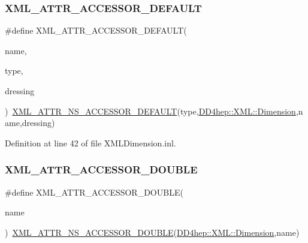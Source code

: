 \hypertarget{_x_m_l_dimension_8inl_a5329c32158716b05939bad5ab5e572df}{}\label{_x_m_l_dimension_8inl_a5329c32158716b05939bad5ab5e572df} 
\subsubsection{\texorpdfstring{X\+M\+L\+\_\+\+A\+T\+T\+R\+\_\+\+A\+C\+C\+E\+S\+S\+O\+R\+\_\+\+D\+E\+F\+A\+U\+LT}{XML\_ATTR\_ACCESSOR\_DEFAULT}}
{\footnotesize\ttfamily \#define X\+M\+L\+\_\+\+A\+T\+T\+R\+\_\+\+A\+C\+C\+E\+S\+S\+O\+R\+\_\+\+D\+E\+F\+A\+U\+LT(\begin{DoxyParamCaption}\item[{}]{name,  }\item[{}]{type,  }\item[{}]{dressing }\end{DoxyParamCaption})~\hyperlink{_x_m_l_dimension_8inl_a621d9cfc07f37e663ecb8f6c5bd22dfa}{X\+M\+L\+\_\+\+A\+T\+T\+R\+\_\+\+N\+S\+\_\+\+A\+C\+C\+E\+S\+S\+O\+R\+\_\+\+D\+E\+F\+A\+U\+LT}(type,\hyperlink{struct_d_d4hep_1_1_x_m_l_1_1_dimension}{D\+D4hep\+::\+X\+M\+L\+::\+Dimension},name,dressing)}



Definition at line 42 of file X\+M\+L\+Dimension.\+inl.

\hypertarget{_x_m_l_dimension_8inl_a3b2602f2e6cdf903b4d9acd047d61b12}{}\label{_x_m_l_dimension_8inl_a3b2602f2e6cdf903b4d9acd047d61b12} 
\subsubsection{\texorpdfstring{X\+M\+L\+\_\+\+A\+T\+T\+R\+\_\+\+A\+C\+C\+E\+S\+S\+O\+R\+\_\+\+D\+O\+U\+B\+LE}{XML\_ATTR\_ACCESSOR\_DOUBLE}}
{\footnotesize\ttfamily \#define X\+M\+L\+\_\+\+A\+T\+T\+R\+\_\+\+A\+C\+C\+E\+S\+S\+O\+R\+\_\+\+D\+O\+U\+B\+LE(\begin{DoxyParamCaption}\item[{}]{name }\end{DoxyParamCaption})~\hyperlink{_x_m_l_dimension_8inl_a41ecea5c5f5c5ebc82e772c4dea4c97c}{X\+M\+L\+\_\+\+A\+T\+T\+R\+\_\+\+N\+S\+\_\+\+A\+C\+C\+E\+S\+S\+O\+R\+\_\+\+D\+O\+U\+B\+LE}(\hyperlink{struct_d_d4hep_1_1_x_m_l_1_1_dimension}{D\+D4hep\+::\+X\+M\+L\+::\+Dimension},name)}



